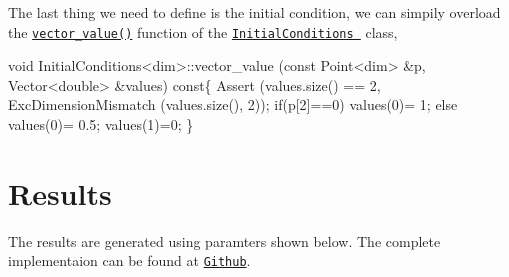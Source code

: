 The last thing we need to define is the initial condition, we can simpily overload the \href{../html/class_initial_conditions.html#aa10cfdd7350c3810a8deab707f397657}{\tt vector\-\_\-value()} function of the \href{../html/class_initial_conditions.html}{\tt Initial\-Conditions } class, 
\begin{DoxyCode}
\textcolor{keywordtype}{void} InitialConditions<dim>::vector_value (\textcolor{keyword}{const} Point<dim>   &p, Vector<double>   &values)\textcolor{keyword}{ const}\{
  Assert (values.size() == 2, ExcDimensionMismatch (values.size(), 2));
    \textcolor{keywordflow}{if}(p[2]==0) values(0)= 1;
  \textcolor{keywordflow}{else} values(0)= 0.5;
    values(1)=0;
\}
\end{DoxyCode}
\hypertarget{growth_results}{}\section{Results}\label{growth_results}
 

The results are generated using paramters shown below. The complete implementaion can be found at \href{https://github.com/mechanoChem/mechanoChemFEM/tree/example/Example4_growth}{\tt Github}.


